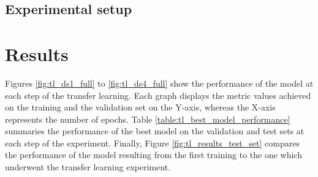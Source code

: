 \subsection{Experimental setup}



\section{Results}

%
%
%


Figures \ref{fig:tl_ds1_full} to \ref{fig:tl_ds4_full} show the performance of the model at each step of the transfer learning. Each graph displays the metric values achieved on the training and the validation set on the Y-axis, whereas the X-axis represents the number of epochs.
Table \ref{table:tl_best_model_performance} summaries the performance of the best model on the validation and test sets at each step of the experiment. 
Finally, Figure \ref{fig:tl_results_test_set} compares the performance of the model resulting from the first training to the one which underwent the transfer learning experiment. 


